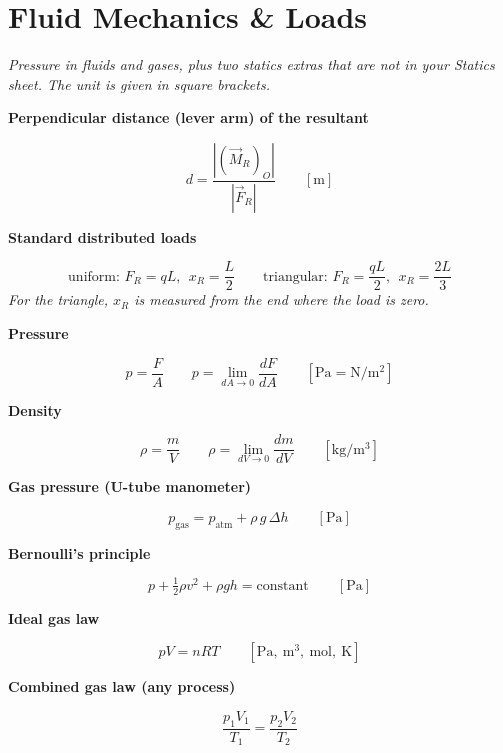 \documentclass[11pt]{article}
\newcommand{\sect}[2]{\section*{\color{#1}#2}}
\newcommand{\sub}[1]{\par\medskip\textbf{#1}\par}
\newcommand{\expl}[1]{{\color{gray}\itshape #1}\par}
\begin{document}
\sect{cStF}{Fluid Mechanics \& Loads}
\expl{Pressure in fluids and gases, plus two statics extras that are not in your Statics sheet. The unit is given in square brackets.}

\sub{Perpendicular distance (lever arm) of the resultant}
\[ d = \frac{\left|\left(\vec M_R\right)_O\right|}{\left|\vec F_R\right|} \qquad [\mathrm{m}] \]

\sub{Standard distributed loads}
\[ \text{uniform: } F_R = qL,\ \ x_R = \frac{L}{2} \qquad \text{triangular: } F_R = \frac{qL}{2},\ \ x_R = \frac{2L}{3} \]
\expl{For the triangle, $x_R$ is measured from the end where the load is zero.}

\sub{Pressure}
\[ p = \frac{F}{A} \qquad p = \lim_{dA\to 0}\frac{dF}{dA} \qquad [\mathrm{Pa} = \mathrm{N/m^2}] \]

\sub{Density}
\[ \rho = \frac{m}{V} \qquad \rho = \lim_{dV\to 0}\frac{dm}{dV} \qquad [\mathrm{kg/m^3}] \]

\sub{Gas pressure (U-tube manometer)}
\[ p_{\text{gas}} = p_{\text{atm}} + \rho\,g\,\Delta h \qquad [\mathrm{Pa}] \]

\sub{Bernoulli's principle}
\[ p + \tfrac{1}{2}\rho v^2 + \rho g h = \text{constant} \qquad [\mathrm{Pa}] \]

\sub{Ideal gas law}
\[ pV = nRT \qquad [\mathrm{Pa},\ \mathrm{m^3},\ \mathrm{mol},\ \mathrm{K}] \]

\sub{Combined gas law (any process)}
\[ \frac{p_1 V_1}{T_1} = \frac{p_2 V_2}{T_2} \]
\end{document}
